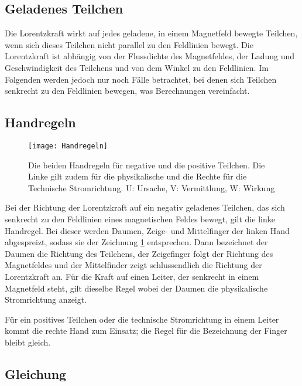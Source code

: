 \subsection{Geladenes Teilchen}

Die Lorentzkraft wirkt auf jedes geladene, in einem Magnetfeld bewegte Teilchen, wenn sich dieses Teilchen nicht parallel zu den Feldlinien bewegt. Die Lorentzkraft ist abhängig von der Flussdichte des Magnetfeldes, der Ladung und Geschwindigkeit des Teilchens und von dem Winkel zu den Feldlinien. Im Folgenden werden jedoch nur noch Fälle betrachtet, bei denen sich Teilchen senkrecht zu den Feldlinien bewegen, was Berechnungen vereinfacht.

\subsection{Handregeln} \label{subsec:handregeln}

\begin{figure}[h!]
	\centering
	\texttt{[image: Handregeln]}
	\caption{Die beiden Handregeln für negative und die positive Teilchen. Die Linke gilt zudem für die physikalische und die Rechte für die Technische Stromrichtung. U: Ursache, V: Vermittlung, W: Wirkung}
	\label{fig:Handregeln}
\end{figure}

Bei der Richtung der Lorentzkraft auf ein negativ geladenes Teilchen, das sich senkrecht zu den Feldlinien eines magnetischen Feldes bewegt, gilt die linke Handregel. Bei dieser werden Daumen, Zeige- und Mittelfinger der linken Hand abgespreizt, sodass sie der Zeichnung \ref{fig:Handregeln} entsprechen. Dann bezeichnet der Daumen die Richtung des Teilchens, der Zeigefinger folgt der Richtung des Magnetfeldes und der Mittelfinder zeigt schlussendlich die Richtung der Lorentzkraft an. Für die Kraft auf einen Leiter, der senkrecht in einem Magnetfeld steht, gilt dieselbe Regel wobei der Daumen die physikalische Stromrichtung anzeigt.

Für ein positives Teilchen oder die technische Stromrichtung in einem Leiter kommt die rechte Hand zum Einsatz; die Regel für die Bezeichnung der Finger bleibt gleich.


\subsection{Gleichung} \label{subsec:BLorentzDefinition}


